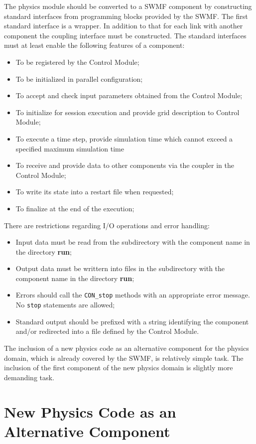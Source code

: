 The physics module should be converted to a SWMF component by constructing 
standard 
interfaces from programming blocks provided by the SWMF.
The first standard interface is a wrapper. 
In addition to that for each link with another component
the coupling interface must be constructed.
The standard interfaces must at least enable the following 
features of a component:
\begin{itemize}
\item To be registered by the Control Module;
\item To be initialized in parallel configuration;
\item To accept and check input parameters obtained from the Control Module;
\item To initialize for session execution and provide grid description to 
      Control Module;
\item To execute a time step, provide simulation time which cannot exceed
      a specified maximum simulation time
\item To receive and provide data to other components via the coupler in 
      the Control Module;
\item To write its state into a restart file when requested;
\item To finalize at the end of the execution;
\end{itemize}
There are restrictions regarding I/O operations and error handling:
\begin{itemize}
\item Input data must be read from the subdirectory with the component name
      in the directory \textbf{run};
\item Output data must be writtern into files in the subdirectory 
      with the component name in the directory \textbf{run};
\item Errors should call the {\tt CON\_stop} methods with an appropriate
      error message. No {\tt stop} statements are allowed;
\item Standard output should be prefixed with a string identifying the
      component and/or redirected into a file defined by the 
      Control Module.
\end{itemize}

The inclusion of a new physics code as  an alternative component for the physics domain, 
which is already covered by the SWMF, is relatively simple task. The inclusion of the first component of 
the new physics domain is slightly more demanding task.


\section{New Physics Code as an Alternative Component}

